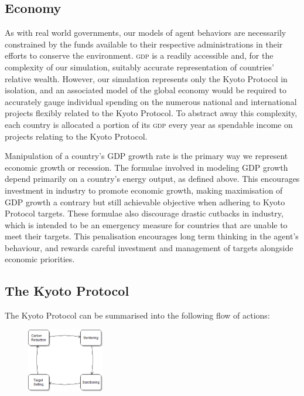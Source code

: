 \subsection{Economy}

As with real world governments, our models of agent behaviors are necessarily constrained by the funds available to their respective administrations in their efforts to conserve the environment. \textsc{gdp} is a readily accessible and, for the complexity of our simulation, suitably accurate representation of countries' relative wealth. However, our simulation represents only the Kyoto Protocol in isolation, and an associated model of the global economy would be required to accurately gauge individual spending on the numerous national and international projects flexibly related to the Kyoto Protocol. To abstract away this complexity, each country is allocated a portion of its \textsc{gdp} every year as spendable income on projects relating to the Kyoto Protocol.

Manipulation of a country's GDP growth rate is the primary way we represent economic growth or recession. The formulae involved in modeling GDP growth depend primarily on a country's energy output, as defined above. This encourages investment in industry to promote economic growth, making maximisation of GDP growth a contrary but still achievable objective when adhering to Kyoto Protocol targets. These formulae also discourage drastic cutbacks in industry, which is intended to be an emergency measure for countries that are unable to meet their targets. This penalisation encourages long term thinking in the agent's behaviour, and rewards careful investment and management of targets alongside economic priorities.

\subsection{The Kyoto Protocol}
The Kyoto Protocol can be summarised into the following flow of actions:

\begin{figure}[h!]
	\centering
	\includegraphics[width=0.3\textwidth]{img/Kyoto_4_states.png}
	\label{fig:kyoto_4_states}
\end{figure}

